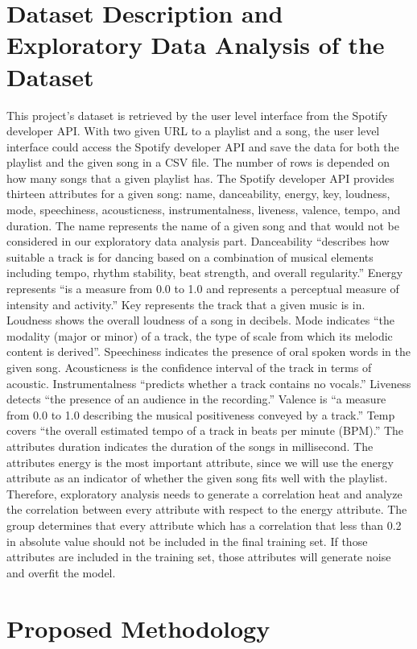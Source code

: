 \documentclass{article}
\begin{document}
\section{Dataset Description and Exploratory Data Analysis of the Dataset}
This project’s dataset is retrieved by the user level interface from the Spotify developer API. With two given URL to a playlist and a song, the user level interface could access the Spotify developer API and save the data for both the playlist and the given song in a CSV file. The number of rows is depended on how many songs that a given playlist has. The Spotify developer API provides thirteen attributes for a given song: name, danceability, energy, key, loudness, mode, speechiness, acousticness, instrumentalness, liveness, valence, tempo, and duration. The name represents the name of a given song and that would not be considered in our exploratory data analysis part. Danceability “describes how suitable a track is for dancing based on a combination of musical elements including tempo, rhythm stability, beat strength, and overall regularity.” Energy represents “is a measure from 0.0 to 1.0 and represents a perceptual measure of intensity and activity.” Key represents the track that a given music is in. Loudness shows the overall loudness of a song in decibels.  Mode indicates “the modality (major or minor) of a track, the type of scale from which its melodic content is derived”. Speechiness indicates the presence of oral spoken words in the given song. Acousticness is the confidence interval of the track in terms of acoustic. Instrumentalness “predicts whether a track contains no vocals.” Liveness detects “the presence of an audience in the recording.” Valence is “a measure from 0.0 to 1.0 describing the musical positiveness conveyed by a track.” Temp covers “the overall estimated tempo of a track in beats per minute (BPM).” The attributes duration indicates the duration of the songs in millisecond. 
The attributes energy is the most important attribute, since we will use the energy attribute as an indicator of whether the given song fits well with the playlist. Therefore, exploratory analysis needs to generate a correlation heat and analyze the correlation between every attribute with respect to the energy attribute. The group determines that every attribute which has a correlation that less than 0.2 in absolute value should not be included in the final training set. If those attributes are included in the training set, those attributes will generate noise and overfit the model.

\section{Proposed Methodology}
\end{document}
